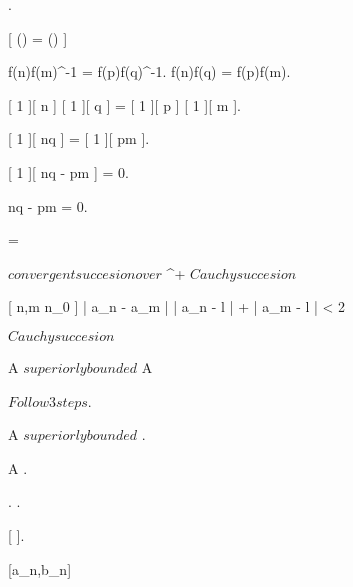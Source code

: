 {{{{			
		}.
		
		{
			[ \phi() = \phi() ]
			{
				f(n)f(m)^{-1} = f(p)f(q)^{-1}.
				f(n)f(q) = f(p)f(m).
				
				[ 1 ][ n ] \cdot {}[ 1 ][ q ] = [ 1 ][ p ] \cdot {}[ 1 ][ m ].

				 = [ 1 ][ pm ].

				[ 1 ][ nq - pm ] = 0.

				nq - pm = 0.

				 = 
			}
		}	
	}
	}



	{
	{
		 $ convergent succesion over $ \K^+
	}
	\holds
	{
		 $ Cauchy succesion $
	}
	\demonstration
	{
		\all{ \eps \in \K^+ }
		{

			[ n,m \geq n_0 ]
			{
				| a_n - a_m | \leq | a_n - l | + | a_m - l | < 2\eps
			}
		}

		\conclude {} $ Cauchy succesion $
	}
	}



	{
	{
		A \subset \R \suchthat $ superiorly bounded $ \logicand A \neq \emptyset
	}
	\holds
	{
	}
	\demonstration
	{
		$ Follow 3 steps $.

		{
			A $ superiorly bounded $ \imp {}.

			A \neq \emptyset \imp {}.

			{
				.
				.
			}
		
			{
				[  ].

				[a_n,b_n] \neq \emptyset \imp {}
			}


}}}}
